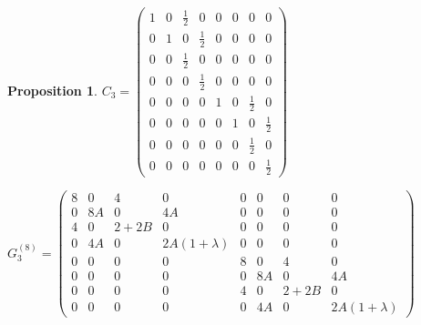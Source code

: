 \documentclass{amsart}
\theoremstyle{plain}
\newtheorem{proposition}[theorem]{Proposition}
\theoremstyle{definition}
\theoremstyle{remark}
\numberwithin{equation}{section}
\begin{document}
\begin{proposition}
\vspace{0.5cm}
\begin{minipage}[t]{0.37\textwidth}
    \vspace{5pt}
    { %
    $ C_{3}=
    \begin{pmatrix}
    1 & 0 & \frac{1}{2} & 0 & 0 & 0 & 0 & 0 \\
    0 & 1 & 0 & \frac{1}{2} & 0 & 0 & 0 & 0 \\
    0 & 0 & \frac{1}{2} & 0 & 0 & 0 & 0 & 0 \\
    0 & 0 & 0 & \frac{1}{2} & 0 & 0 & 0 & 0 \\
    0 & 0 & 0 & 0 & 1 & 0 & \frac{1}{2} & 0 \\
    0 & 0 & 0 & 0 & 0 & 1 & 0 & \frac{1}{2} \\
    0 & 0 & 0 & 0 & 0 & 0 & \frac{1}{2} & 0 \\
    0 & 0 & 0 & 0 & 0 & 0 & 0 & \frac{1}{2} 
    \end{pmatrix}
    $
    }
\end{minipage}
\hfill
\begin{minipage}[t]{0.63\textwidth}
    \vspace{5pt}
    {%
    $G_{3}^{(8)}=
    \begin{pmatrix}
    8 & 0 & 4 & 0 & 0 & 0 & 0 & 0 \\
    0 & 8A & 0 & 4A & 0 & 0 & 0 & 0 \\
    4 & 0 & 2+2B & 0 & 0 & 0 & 0 & 0 \\
    0 & 4A & 0 & 2A(1+\lambda) & 0 & 0 & 0 & 0 \\
    0 & 0 & 0 & 0 & 8 & 0 & 4 & 0 \\
    0 & 0 & 0 & 0 & 0 & 8A & 0 & 4A \\
    0 & 0 & 0 & 0 & 4 & 0 & 2+2B & 0 \\
    0 & 0 & 0 & 0 & 0 & 4A & 0 & 2A(1+\lambda)
    \end{pmatrix}
    $
    }
\end{minipage}


\end{proposition}
\end{document}
